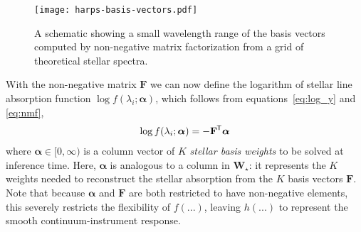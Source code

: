 \documentclass[modern]{aastex631}
\renewcommand{\vec}[1]{\mathbf{#1}}
\newcommand{\vecalpha}{\boldsymbol{\alpha}}
\newcommand{\vecW}{\mathbf{W}} %
\newcommand*{\transpose}{^{\mkern-1.5mu\mathsf{T}}}
\begin{document}
\begin{figure*}
    \texttt{[image: harps-basis-vectors.pdf]}
    \caption{A schematic showing a small wavelength range of the basis vectors computed by non-negative matrix factorization from a grid of theoretical stellar spectra.\label{fig:schematic}}
\end{figure*}


\noindent{}With the non-negative matrix $\vec{F}$ we can now define the logarithm of stellar line absorption function $\log{f(\lambda_i;\vecalpha)}$, which follows from equations~\ref{eq:log_y} and \ref{eq:nmf},
\begin{align}
    \log{f(\lambda_i;\vecalpha)} = -\vec{F}\transpose\vecalpha \label{eq:log-f}
\end{align}
where $\vecalpha \in [0, \infty)$ is a column vector of $K$ \emph{stellar basis weights} to be solved at inference time. Here, $\vecalpha$ is analogous to a column in $\vecW_\star$: it represents the $K$ weights needed to reconstruct the stellar absorption from the $K$ basis vectors $\vec{F}$. Note that because $\vecalpha$ and $\vec{F}$ are both restricted to have non-negative elements, this severely restricts the flexibility of $f(...)$, leaving $h(...)$ to represent the smooth continuum-instrument response. \\
\end{document}
